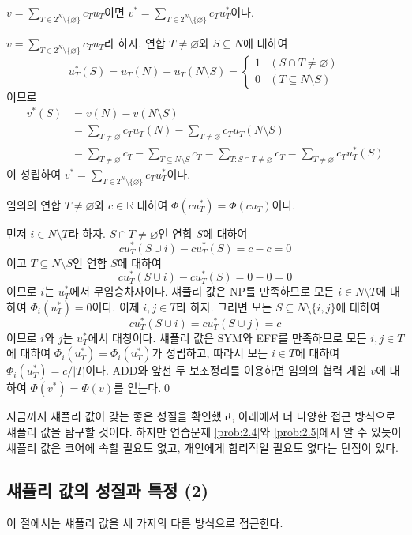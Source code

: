 \documentclass{article}
\numberwithin{equation}{section}
\begin{document}
\begin{sol}
	\begin{lemma*}{}{}
		$v=\sum_{T\in 2^N\setminus\{\varnothing\}}c_Tu_T$이면 $v^*=\sum_{T\in 2^N\setminus\{\varnothing\}}c_Tu_T^*$이다.
	\end{lemma*}
	$v=\sum_{T\in 2^N\setminus\{\varnothing\}}c_Tu_T$라 하자. 연합 $T\ne\varnothing$와 $S\subseteq N$에 대하여
	\[
		u_T^*(S)=u_T(N)-u_T(N\setminus S)=\begin{cases}
			1 & (S\cap T\ne\varnothing)\\
			0 & (T\subseteq N\setminus S)
		\end{cases}
	\]
	이므로
	\[
		\begin{aligned}
			v^*(S)&=v(N)-v(N\setminus S)\\
			&=\sum_{T\ne\varnothing}c_Tu_T(N)-\sum_{T\ne\varnothing}c_Tu_T(N\setminus S)\\
			&=\sum_{T\ne\varnothing}c_T-\sum_{T\subseteq N\setminus S}c_T=\sum_{T:S\cap T\ne\varnothing}c_T=\sum_{T\ne\varnothing}c_Tu_T^*(S)
		\end{aligned}
	\]
	이 성립하여 $v^*=\sum_{T\in 2^N\setminus\{\varnothing\}}c_Tu_T^*$이다.
	\begin{lemma*}{}{}
		임의의 연합 $T\ne\varnothing$와 $c\in\mathbb R$ 대하여 $\Phi(cu_T^*)=\Phi(cu_T)$이다.
	\end{lemma*}
	먼저 $i\in N\setminus T$라 하자. $S\cap T\ne\varnothing$인 연합 $S$에 대하여
	\[
		cu_T^*(S\cup i)-cu_T^*(S)=c-c=0
	\]
	이고 $T\subseteq N\setminus S$인 연합 $S$에 대하여
	\[
		cu_T^*(S\cup i)-cu_T^*(S)=0-0=0
	\]
	이므로 $i$는 $u_T^*$에서 무임승차자이다. 섀플리 값은 NP를 만족하므로 모든 $i\in N\setminus T$에 대하여 $\Phi_i(u_T^*)=0$이다. 이제 $i,j\in T$라 하자. 그러면 모든 $S\subseteq N\setminus\{i,j\}$에 대하여
	\[
		cu_T^*(S\cup i)=cu_T^*(S\cup j)=c
	\]
	이므로 $i$와 $j$는 $u_T^*$에서 대칭이다. 섀플리 값은 SYM와 EFF를 만족하므로 모든 $i,j\in T$에 대하여 $\Phi_i(u_T^*)=\Phi_i(u_T^*)$가 성립하고, 따라서 모든 $i\in T$에 대하여 $\Phi_i(u_T^*)=c/\vert T\vert$이다. ADD와 앞선 두 보조정리를 이용하면 임의의 협력 게임 $v$에 대하여 $\Phi(v^*)=\Phi(v)$를 얻는다.\qed
\end{sol}

지금까지 섀플리 값이 갖는 좋은 성질을 확인했고, 아래에서 더 다양한 접근 방식으로 섀플리 값을 탐구할 것이다. 하지만 연습문제 \ref{prob:2.4}와 \ref{prob:2.5}에서 알 수 있듯이 섀플리 값은 코어에 속할 필요도 없고, 개인에게 합리적일 필요도 없다는 단점이 있다.

\subsection{섀플리 값의 성질과 특정 (2)}
이 절에서는 섀플리 값을 세 가지의 다른 방식으로 접근한다.
\end{document}

